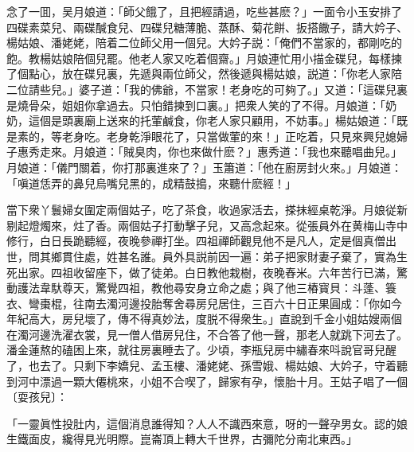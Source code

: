 念了一囬，吴月娘道：「師父餓了，且把經請過，吃些甚麽？」一面令小玉安排了四碟素菜兒、兩碟醎食兒、四碟兒糖薄脆、蒸酥、菊花餅、扳搭饊子，請大妗子、楊姑娘、潘姥姥，陪着二位師父用一個兒。大妗子説：「俺們不當家的，都剛吃的飽。教楊姑娘陪個兒罷。他老人家又吃着個齋。」月娘連忙用小描金碟兒，每樣揀了個點心，放在碟兒裏，先遞與兩位師父，然後遞與楊姑娘，説道：「你老人家陪二位請些兒。」婆子道：「我的佛爺，不當家！老身吃的可夠了。」又道：「這碟兒裏是燒骨朵，姐姐你拿過去。只怕錯揀到口裏。」把衆人笑的了不得。月娘道：「奶奶，這個是頭裏廟上送來的托葷鹹食，你老人家只顧用，不妨事。」楊姑娘道：「既是素的，等老身吃。老身乾淨眼花了，只當做葷的來！」正吃着，只見來興兒媳婦子惠秀走來。月娘道：「賊臭肉，你也來做什麽？」惠秀道：「我也來聽唱曲兒。」月娘道：「儀門關着，你打那裏進來了？」玉簫道：「他在廚房封火來。」月娘道：「嗔道恁弄的鼻兒烏嘴兒黑的，成精鼓搗，來聽什麽經！」

當下衆丫鬟婦女圍定兩個姑子，吃了茶食，收過家活去，搽抹經桌乾淨。月娘従新剔起燈燭來，炷了香。兩個姑子打動擊子兒，又高念起來。從張員外在黄梅山寺中修行，白日長跪聽經，夜晚參禪打坐。四祖禪師觀見他不是凡人，定是個真僧出世，問其鄉貫住處，姓甚名誰。員外具説前因一遍：弟子把家財妻子棄了，實為生死出家。四祖收留座下，做了徒弟。白日教他栽樹，夜晚舂米。六年苦行已滿，驚動護法韋馱尊天，驚覺四祖，教他尋安身立命之處；與了他三樁寳貝：斗蓬、簑衣、彎棗棍，往南去濁河邊投胎奪舍尋房兒居住，三百六十日正果圓成：「你如今年紀高大，房兒壞了，傳不得真妙法，度脱不得衆生。」直說到千金小姐姑嫂兩個在濁河邊洗濯衣裳，見一僧人借房兒住，不合答了他一聲，那老人就跳下河去了。潘金蓮熬的磕困上來，就往房裏睡去了。少頃，李瓶兒房中繡春來呌說官哥兒醒了，也去了。只剩下李嬌兒、孟玉樓、潘姥姥、孫雪娥、楊姑娘、大妗子，守着聽到河中漂過一顆大僊桃來，小姐不合喫了，歸家有孕，懷胎十月。王姑子唱了一個〔耍孩兒〕：

\begin{myquote}
「一靈眞性投肚内，這個消息誰得知？人人不識西來意，呀的一聲孕男女。認的娘生鐵面皮，纔得見光明際。崑崙頂上轉大千世界，古彌陀分南北東西。」

\end{myquote}

